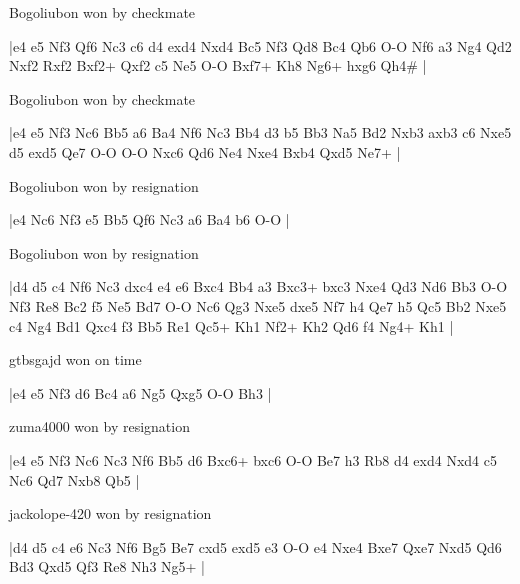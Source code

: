 \showboard

Bogoliubon won by checkmate

\makegametitle
|e4 e5 Nf3 Qf6 Nc3 c6 d4 exd4 Nxd4 Bc5 Nf3 Qd8 Bc4 Qb6 O-O Nf6 a3 Ng4 Qd2 Nxf2 Rxf2 Bxf2+ Qxf2 c5 Ne5 O-O Bxf7+ Kh8 Ng6+ hxg6 Qh4\#  |

\showboard

Bogoliubon won by checkmate

\makegametitle
|e4 e5 Nf3 Nc6 Bb5 a6 Ba4 Nf6 Nc3 Bb4 d3 b5 Bb3 Na5 Bd2 Nxb3 axb3 c6 Nxe5 d5 exd5 Qe7 O-O O-O Nxc6 Qd6 Ne4 Nxe4 Bxb4 Qxd5 Ne7+  |

\showboard

Bogoliubon won by resignation

\makegametitle
|e4 Nc6 Nf3 e5 Bb5 Qf6 Nc3 a6 Ba4 b6 O-O  |

\showboard

Bogoliubon won by resignation

\makegametitle
|d4 d5 c4 Nf6 Nc3 dxc4 e4 e6 Bxc4 Bb4 a3 Bxc3+ bxc3 Nxe4 Qd3 Nd6 Bb3 O-O Nf3 Re8 Bc2 f5 Ne5 Bd7 O-O Nc6 Qg3 Nxe5 dxe5 Nf7 h4 Qe7 h5 Qc5 Bb2 Nxe5 c4 Ng4 Bd1 Qxc4 f3 Bb5 Re1 Qc5+ Kh1 Nf2+ Kh2 Qd6 f4 Ng4+ Kh1  |

\showboard

gtbsgajd won on time

\makegametitle
|e4 e5 Nf3 d6 Bc4 a6 Ng5 Qxg5 O-O Bh3  |

\showboard

zuma4000 won by resignation

\makegametitle
|e4 e5 Nf3 Nc6 Nc3 Nf6 Bb5 d6 Bxc6+ bxc6 O-O Be7 h3 Rb8 d4 exd4 Nxd4 c5 Nc6 Qd7 Nxb8 Qb5  |

\showboard

jackolope-420 won by resignation

\makegametitle
|d4 d5 c4 e6 Nc3 Nf6 Bg5 Be7 cxd5 exd5 e3 O-O e4 Nxe4 Bxe7 Qxe7 Nxd5 Qd6 Bd3 Qxd5 Qf3 Re8 Nh3 Ng5+  |

